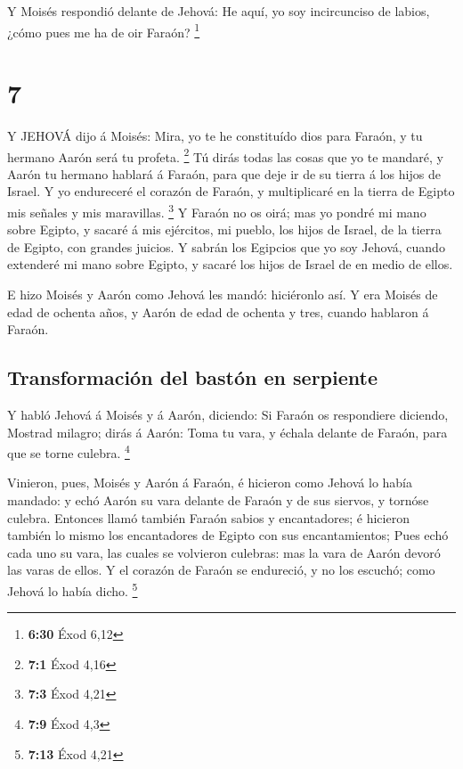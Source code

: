  Y Moisés respondió delante de Jehová: He aquí, yo soy
incircunciso de labios, ¿cómo pues me ha de oir Faraón? \footnote{\textbf{6:30}
  Éxod 6,12}

\hypertarget{section-6}{%
\section{7}\label{section-6}}

 Y JEHOVÁ dijo á Moisés: Mira, yo te he constituído dios
para Faraón, y tu hermano Aarón será tu profeta. \footnote{\textbf{7:1}
  Éxod 4,16}  Tú dirás todas las cosas que yo te mandaré, y
Aarón tu hermano hablará á Faraón, para que deje ir de su tierra á los
hijos de Israel.  Y yo endureceré el corazón de Faraón, y
multiplicaré en la tierra de Egipto mis señales y mis maravillas.
\footnote{\textbf{7:3} Éxod 4,21}  Y Faraón no os oirá; mas
yo pondré mi mano sobre Egipto, y sacaré á mis ejércitos, mi pueblo, los
hijos de Israel, de la tierra de Egipto, con grandes juicios.
 Y sabrán los Egipcios que yo soy Jehová, cuando extenderé
mi mano sobre Egipto, y sacaré los hijos de Israel de en medio de ellos.

 E hizo Moisés y Aarón como Jehová les mandó: hiciéronlo
así.  Y era Moisés de edad de ochenta años, y Aarón de edad
de ochenta y tres, cuando hablaron á Faraón.

\hypertarget{transformaciuxf3n-del-bastuxf3n-en-serpiente}{%
\subsection{Transformación del bastón en
serpiente}\label{transformaciuxf3n-del-bastuxf3n-en-serpiente}}

 Y habló Jehová á Moisés y á Aarón, diciendo: 
Si Faraón os respondiere diciendo, Mostrad milagro; dirás á Aarón: Toma
tu vara, y échala delante de Faraón, para que se torne culebra.
\footnote{\textbf{7:9} Éxod 4,3}

 Vinieron, pues, Moisés y Aarón á Faraón, é hicieron como
Jehová lo había mandado: y echó Aarón su vara delante de Faraón y de sus
siervos, y tornóse culebra.  Entonces llamó también Faraón
sabios y encantadores; é hicieron también lo mismo los encantadores de
Egipto con sus encantamientos;  Pues echó cada uno su vara,
las cuales se volvieron culebras: mas la vara de Aarón devoró las varas
de ellos.  Y el corazón de Faraón se endureció, y no los
escuchó; como Jehová lo había dicho. \footnote{\textbf{7:13} Éxod 4,21}


